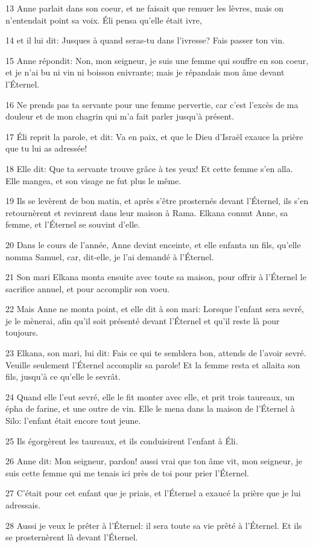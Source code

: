 \par 13 Anne parlait dans son coeur, et ne faisait que remuer les lèvres, mais on n'entendait point sa voix. Éli pensa qu'elle était ivre,
\par 14 et il lui dit: Jusques à quand seras-tu dans l'ivresse? Fais passer ton vin.
\par 15 Anne répondit: Non, mon seigneur, je suis une femme qui souffre en son coeur, et je n'ai bu ni vin ni boisson enivrante; mais je répandais mon âme devant l'Éternel.
\par 16 Ne prends pas ta servante pour une femme pervertie, car c'est l'excès de ma douleur et de mon chagrin qui m'a fait parler jusqu'à présent.
\par 17 Éli reprit la parole, et dit: Va en paix, et que le Dieu d'Israël exauce la prière que tu lui as adressée!
\par 18 Elle dit: Que ta servante trouve grâce à tes yeux! Et cette femme s'en alla. Elle mangea, et son visage ne fut plus le même.
\par 19 Ils se levèrent de bon matin, et après s'être prosternés devant l'Éternel, ils s'en retournèrent et revinrent dans leur maison à Rama. Elkana connut Anne, sa femme, et l'Éternel se souvint d'elle.
\par 20 Dans le cours de l'année, Anne devint enceinte, et elle enfanta un fils, qu'elle nomma Samuel, car, dit-elle, je l'ai demandé à l'Éternel.
\par 21 Son mari Elkana monta ensuite avec toute sa maison, pour offrir à l'Éternel le sacrifice annuel, et pour accomplir son voeu.
\par 22 Mais Anne ne monta point, et elle dit à son mari: Lorsque l'enfant sera sevré, je le mènerai, afin qu'il soit présenté devant l'Éternel et qu'il reste là pour toujours.
\par 23 Elkana, son mari, lui dit: Fais ce qui te semblera bon, attends de l'avoir sevré. Veuille seulement l'Éternel accomplir sa parole! Et la femme resta et allaita son fils, jusqu'à ce qu'elle le sevrât.
\par 24 Quand elle l'eut sevré, elle le fit monter avec elle, et prit trois taureaux, un épha de farine, et une outre de vin. Elle le mena dans la maison de l'Éternel à Silo: l'enfant était encore tout jeune.
\par 25 Ils égorgèrent les taureaux, et ils conduisirent l'enfant à Éli.
\par 26 Anne dit: Mon seigneur, pardon! aussi vrai que ton âme vit, mon seigneur, je suis cette femme qui me tenais ici près de toi pour prier l'Éternel.
\par 27 C'était pour cet enfant que je priais, et l'Éternel a exaucé la prière que je lui adressais.
\par 28 Aussi je veux le prêter à l'Éternel: il sera toute sa vie prêté à l'Éternel. Et ils se prosternèrent là devant l'Éternel.

